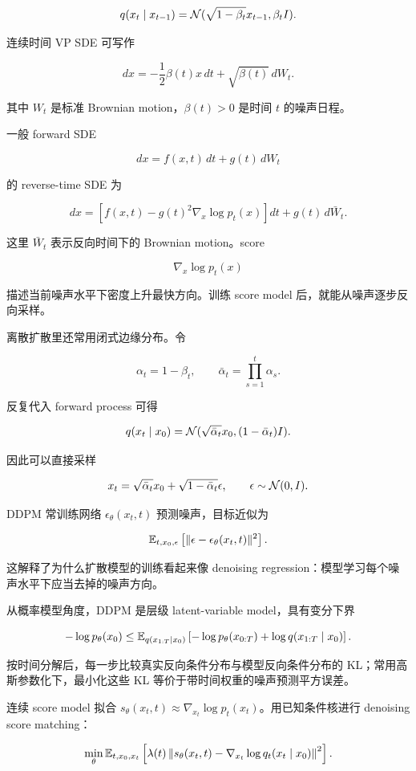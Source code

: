 \documentclass[11pt]{ctexart}
\begin{document}
\[
  q(x_t\mid x_{t-1})
  =
  \mathcal{N}(\sqrt{1-\beta_t}x_{t-1},\beta_t I).
\]

连续时间 VP SDE 可写作

\[
  dx=-\frac12\beta(t)x\,dt+\sqrt{\beta(t)}\,dW_t.
\]

其中 \(W_t\) 是标准 Brownian motion，\(\beta(t)>0\) 是时间 \(t\) 的噪声日程。

一般 forward SDE

\[
  dx=f(x,t)\,dt+g(t)\,dW_t
\]

的 reverse-time SDE 为

\[
  dx=
  \left[
    f(x,t)-g(t)^2\nabla_x\log p_t(x)
  \right]dt
  +
  g(t)\,d\bar W_t.
\]

这里 \(\bar W_t\) 表示反向时间下的 Brownian motion。score

\[
  \nabla_x\log p_t(x)
\]

描述当前噪声水平下密度上升最快方向。训练 score model 后，就能从噪声逐步反向采样。

离散扩散里还常用闭式边缘分布。令

\[
  \alpha_t=1-\beta_t,
  \qquad
  \bar\alpha_t=\prod_{s=1}^{t}\alpha_s.
\]

反复代入 forward process 可得

\[
  q(x_t\mid x_0)
  =
  \mathcal{N}(\sqrt{\bar\alpha_t}x_0,(1-\bar\alpha_t)I).
\]

因此可以直接采样

\[
  x_t
  =
  \sqrt{\bar\alpha_t}x_0
  +
  \sqrt{1-\bar\alpha_t}\epsilon,
  \qquad
  \epsilon\sim\mathcal{N}(0,I).
\]

DDPM 常训练网络 \(\epsilon_\theta(x_t,t)\) 预测噪声，目标近似为

\[
  \mathbb{E}_{t,x_0,\epsilon}
  \left[
    \|\epsilon-\epsilon_\theta(x_t,t)\|^2
  \right].
\]

这解释了为什么扩散模型的训练看起来像 denoising regression：模型学习每个噪声水平下应当去掉的噪声方向。

从概率模型角度，DDPM 是层级 latent-variable model，具有变分下界

\[
  -\log p_\theta(x_0)\le
  \mathbb{E}_{q(x_{1:T}\mid x_0)}
  \left[-\log p_\theta(x_{0:T})+\log q(x_{1:T}\mid x_0)\right].
\]

按时间分解后，每一步比较真实反向条件分布与模型反向条件分布的 KL；常用高斯参数化下，最小化这些 KL 等价于带时间权重的噪声预测平方误差。

连续 score model 拟合 \(s_\theta(x_t,t)\approx\nabla_{x_t}\log p_t(x_t)\)。用已知条件核进行 denoising score matching：

\[
  \min_\theta\mathbb{E}_{t,x_0,x_t}
  \left[\lambda(t)\left\|s_\theta(x_t,t)-\nabla_{x_t}\log q_t(x_t\mid x_0)\right\|^2\right].
\]
\end{document}
